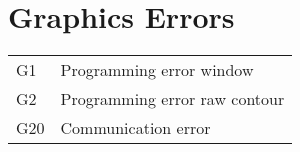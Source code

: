 \documentclass[openany,11pt]{book}
\begin{document}
\section*{Graphics Errors}

\begin{table}[!h]
    \begin{tabular}{ll}
    G1 & Programming error window \\
    G2 & Programming error raw contour \\
    G20 & Communication error \\
    \end{tabular}
\end{table}
\end{document}
